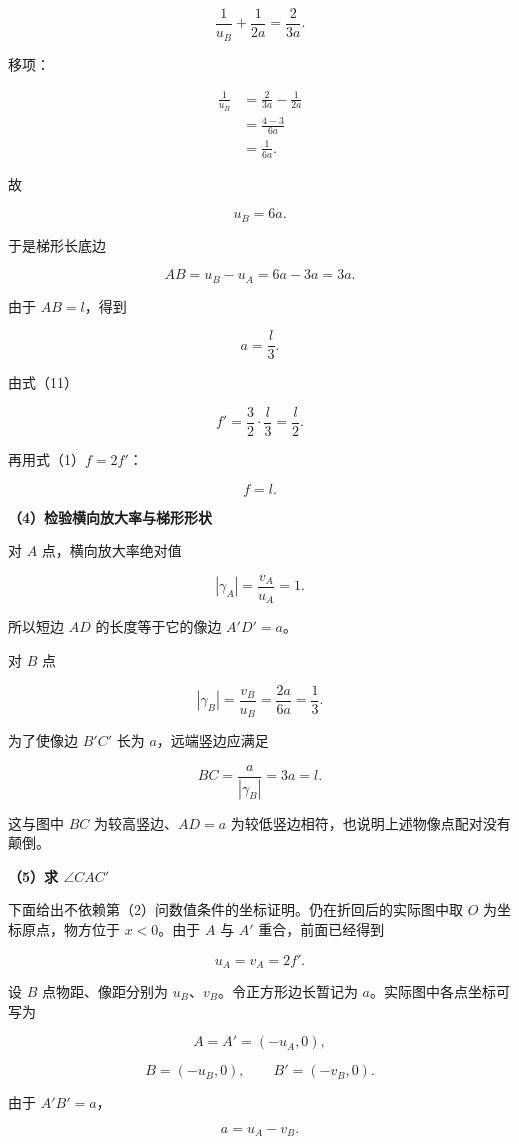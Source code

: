 \documentclass[12pt,a4paper,UTF8]{ctexart}
\begin{document}
\[
\frac1{u_B}+\frac1{2a}=\frac{2}{3a}.
\]

移项：

\[
\begin{aligned}
\frac1{u_B}
&=\frac{2}{3a}-\frac1{2a}\\
&=\frac{4-3}{6a}\\
&=\frac1{6a}.
\end{aligned}
\]

故

\[
\boxed{u_B=6a}.
\tag{14}
\]

于是梯形长底边

\[
AB=u_B-u_A=6a-3a=3a.
\tag{15}
\]

由于 \(AB=l\)，得到

\[
\boxed{a=\frac l3}.
\tag{16}
\]

由式（11）

\[
f'=\frac32\cdot\frac l3=\frac l2.
\]

再用式（1）\(f=2f'\)：

\[
\boxed{f=l}.
\tag{17}
\]

\textbf{（4）检验横向放大率与梯形形状}

对 \(A\) 点，横向放大率绝对值

\[
|\gamma_A|=\frac{v_A}{u_A}=1.
\tag{18}
\]

所以短边 \(AD\) 的长度等于它的像边 \(A'D'=a\)。

对 \(B\) 点

\[
|\gamma_B|=\frac{v_B}{u_B}
=\frac{2a}{6a}
=\frac13.
\tag{19}
\]

为了使像边 \(B'C'\) 长为 \(a\)，远端竖边应满足

\[
BC=\frac{a}{|\gamma_B|}=3a=l.
\tag{20}
\]

这与图中 \(BC\) 为较高竖边、\(AD=a\)
为较低竖边相符，也说明上述物像点配对没有颠倒。

\textbf{（5）求 \(\angle CAC'\)}

下面给出不依赖第（2）问数值条件的坐标证明。仍在折回后的实际图中取 \(O\)
为坐标原点，物方位于 \(x<0\)。由于 \(A\) 与 \(A'\) 重合，前面已经得到

\[
u_A=v_A=2f'.
\tag{21}
\]

设 \(B\) 点物距、像距分别为 \(u_B\)、\(v_B\)。令正方形边长暂记为
\(a\)。实际图中各点坐标可写为

\[
A=A'=(-u_A,0),
\tag{22}
\]

\[
B=(-u_B,0),
\qquad
B'=(-v_B,0).
\tag{23}
\]

由于 \(A'B'=a\)，

\[
a=u_A-v_B.
\tag{24}
\]
\end{document}
